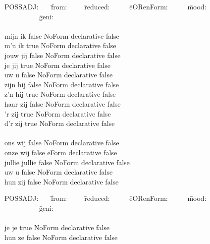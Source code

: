 \begin{tabbing}
POSSADJ: \ \ \  \= from:\ \ \ \ \  \= reduced: \ \ \ \ \  \= eORenForm: 
\ \ \ \ \  \= mood:  \ \ \ \ \ \ \ \ \ \    \= geni: \\
         \>       \>          \>            \>           \>       \\
mijn    \> ik    \> false    \> NoForm    \> declarative \> false \\
m'n     \> ik    \> true     \> NoForm    \> declarative \> false \\
jouw    \> jij   \> false    \> NoForm    \> declarative \> false \\
je      \> jij   \> true     \> NoForm    \> declarative \> false \\
uw      \> u     \> false    \> NoForm    \> declarative \> false \\
zijn    \> hij   \> false    \> NoForm    \> declarative \> false \\
z'n     \> hij   \> true     \> NoForm    \> declarative \> false \\
haar    \> zij   \> false    \> NoForm    \> declarative \> false \\
'r      \> zij   \> true     \> NoForm    \> declarative \> false \\
d'r     \> zij   \> true     \> NoForm    \> declarative \> false \\
        \>       \>          \>           \>             \>       \\
ons     \> wij   \> false    \> NoForm    \> declarative \> false \\
onze    \> wij   \> false    \> eForm     \> declarative \> false \\
jullie  \> jullie\> false    \> NoForm    \> declarative \> false \\
uw      \> u     \> false    \> NoForm    \> declarative \> false \\
hun     \> zij   \> false    \> NoForm    \> declarative \> false \\
\end{tabbing}

\begin{tabbing}
POSSADJ: \ \ \  \= from:\ \ \ \ \  \= reduced: \ \ \ \ \  \= eORenForm: 
\ \ \ \ \  \= mood:  \ \ \ \ \ \ \ \ \ \    \= geni: \\
         \>       \>          \>            \>           \>       \\
je      \> je    \> true      \> NoForm    \> declarative \> false \\
hun     \> ze    \> false     \> NoForm    \> declarative \> false \\
\end{tabbing}

